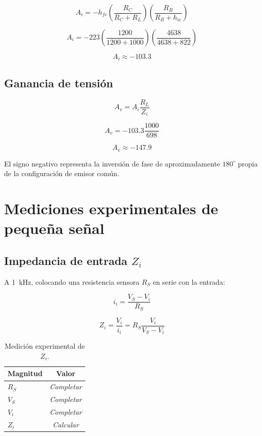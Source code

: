 \documentclass[a4paper,12pt]{article}
\begin{document}
\[
A_i
=
-h_{fe}
\left(
\frac{R_C}{R_C+R_L}
\right)
\left(
\frac{R_B}{R_B+h_{ie}}
\right)
\]

\[
A_i
=
-223
\left(
\frac{1200}{1200+1000}
\right)
\left(
\frac{4638}{4638+822}
\right)
\]

\[
\boxed{A_i\approx-103.3}
\]

\subsection{Ganancia de tensión}

\[
A_v
=
A_i\frac{R_L}{Z_i}
\]

\[
A_v
=
-103.3
\frac{1000}{698}
\]

\[
\boxed{A_v\approx-147.9}
\]

El signo negativo representa la inversión de fase de aproximadamente $180^\circ$ propia de la
configuración de emisor común.

\section{Mediciones experimentales de pequeña señal}

\subsection{Impedancia de entrada $Z_i$}

A \SI{1}{kHz}, colocando una resistencia sensora $R_S$ en serie con la entrada:

\[
i_i
=
\frac{V_S-V_i}{R_S}
\]

\[
Z_i
=
\frac{V_i}{i_i}
=
R_S\frac{V_i}{V_S-V_i}
\]

\begin{table}[H]
\centering
\caption{Medición experimental de $Z_i$.}
\begin{tabular}{lc}
\toprule
Magnitud & Valor\\
\midrule
$R_S$ & \textit{Completar}\\
$V_S$ & \textit{Completar}\\
$V_i$ & \textit{Completar}\\
$Z_i$ & \textit{Calcular}\\
\bottomrule
\end{tabular}
\end{table}
\end{document}
